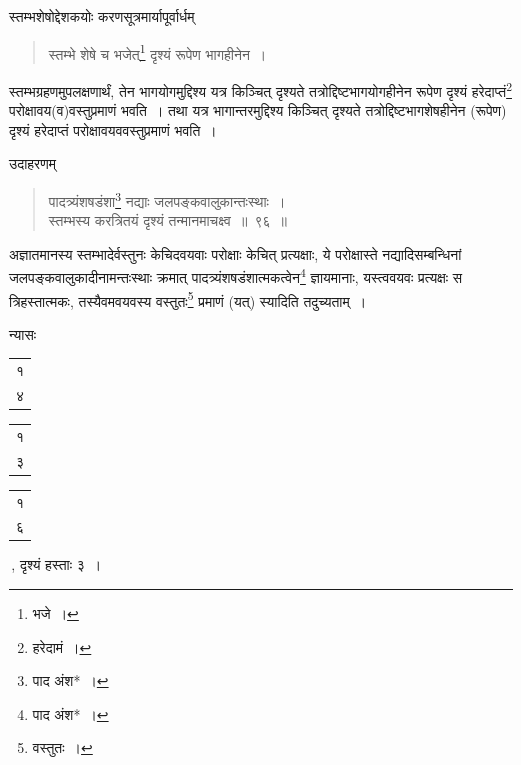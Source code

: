 \documentclass[10pt, openany]{book}
\begin{document}
{{{\newpage

\vspace{3mm}

{स्तम्भशेषोद्देशकयोः करणसूत्रमार्यापूर्वार्धम्\textemdash}

\begin{quote}

{\bs स्तम्भे शेषे च भजेत्\renewcommand{\thefootnote}{\s २}\footnote{\s भजे~।} दृश्यं रूपेण भागहीनेन~।}
\end{quote}

{स्तम्भग्रहणमुपलक्षणार्थं, तेन भागयोगमुद्दिश्य यत्र किञ्चित् दृश्यते
तत्रोद्दिष्टभागयोगहीनेन रूपेण दृश्यं हरेदाप्तं\renewcommand{\thefootnote}{\s ३}\footnote{\s हरेदामं~।} परोक्षावय(व)वस्तुप्रमाणं भवति~। तथा
यत्र भागान्तरमुद्दिश्य}
{किञ्चित् दृश्यते तत्रोद्दिष्टभागशेषहीनेन (रूपेण) दृश्यं हरेदाप्तं
परोक्षावयववस्तुप्रमाणं भवति~।}

\vspace{3mm}
{उदाहरणम्\textemdash}

\begin{quote}
{\eg पादत्र्यंशषडंशा\renewcommand{\thefootnote}{\s ४}\footnote{\s पाद अंश*~।} नद्याः जलपङ्कवालुकान्तःस्थाः~। \\
 स्तम्भस्य करत्रितयं दृश्यं तन्मानमाचक्ष्व~॥~९६~॥}\end{quote}

{अज्ञातमानस्य स्तम्भादेर्वस्तुनः केचिदवयवाः परोक्षाः केचित्
प्रत्यक्षाः, ये परोक्षास्ते}
{नद्यादिसम्बन्धिनां जलपङ्कवालुकादीनामन्तःस्थाः क्रमात्
पादत्र्यंशषडंशात्मकत्वेन\renewcommand{\thefootnote}{\s ५}\footnote{\s पाद अंश*~।} ज्ञायमानाः,}
{यस्त्ववयवः प्रत्यक्षः स त्रिहस्तात्मकः, तस्यैवमवयवस्य वस्तुतः\renewcommand{\thefootnote}{\s ६}\footnote{\s वस्तुतः~।}
प्रमाणं (यत्) स्यादिति}
{तदुच्यताम्~।}
\vspace{3mm}

{न्यासः\textendash \hspace{4mm} \begin{tabular}{|c|}१\\ ४\\\hline \end{tabular}\begin{tabular}{r|}१\\ ३\\\hline \end{tabular}\begin{tabular}{r|}१\\ ६\\\hline \end{tabular}\,, दृश्यं हस्ताः ३~।}
\vspace{3mm}

}}}
\end{document}
